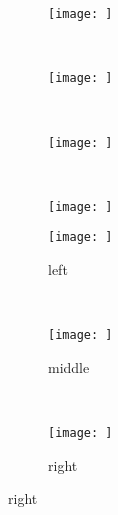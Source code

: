 \documentclass[10pt]{article}
\newcommand{\threeimgwidth}{0.3\textwidth}
\newcommand{\twobytwoimgwidth}{0.4\textwidth}
\begin{document}
\begin{figure}[htbp]
  \centering
  \begin{subfigure}[b]{\twobytwoimgwidth}
    \texttt{[image: ]}
    \caption{}
  \end{subfigure}%
  ~ %
  \begin{subfigure}[b]{\twobytwoimgwidth}
    \texttt{[image: ]}
    \caption{}
  \end{subfigure}
  \\[0.01\textheight]
    \begin{subfigure}[b]{\twobytwoimgwidth}
    \texttt{[image: ]}
    \caption{}
  \end{subfigure}
  ~
  \begin{subfigure}[b]{\twobytwoimgwidth}
    \texttt{[image: ]}
    \caption{}
  \end{subfigure}%
  \caption{}
\end{figure}


\begin{figure}[htbp]
  \centering
  \begin{subfigure}[b]{\threeimgwidth}
    \texttt{[image: ]}
    \caption{left}
  \end{subfigure}%
  ~ %
    \begin{subfigure}[b]{\threeimgwidth}
    \texttt{[image: ]}
    \caption{middle}
  \end{subfigure}
  ~
  \begin{subfigure}[b]{\threeimgwidth}
    \texttt{[image: ]}
    \caption{right}
  \end{subfigure}%
\end{figure}
\end{document}
